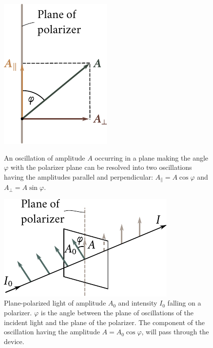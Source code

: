 \begin{figure}[t]
	\begin{minipage}[t]{0.48\linewidth}
		\begin{center}
			\includegraphics[scale=0.95]{figures/ch_19/fig_19_3.pdf}
            \caption[]{An oscillation of amplitude $A$ occurring in a plane making the angle $\varphi$ with the polarizer plane can be resolved into two oscillations having the amplitudes parallel and perpendicular: $A_{\parallel} =A\cos\varphi$ and $A_{\perp}=A\sin\varphi$.}
			\label{fig:19_3}
		\end{center}
	\end{minipage}
	\hfill{ }%
	\begin{minipage}[t]{0.48\linewidth}
		\begin{center}
			\includegraphics[scale=0.95]{figures/ch_19/fig_19_4.pdf}
			\caption[]{Plane-polarized light of amplitude $A_0$ and intensity $I_0$ falling on a polarizer. $\varphi$ is the angle between the plane of oscillations of the incident light and the plane of the polarizer. The component of the oscillation having the amplitude $A=A_0\cos\varphi$, will pass through the device.}
			\label{fig:19_4}
		\end{center}
	\end{minipage}
\vspace{-0.5cm}
\end{figure}

